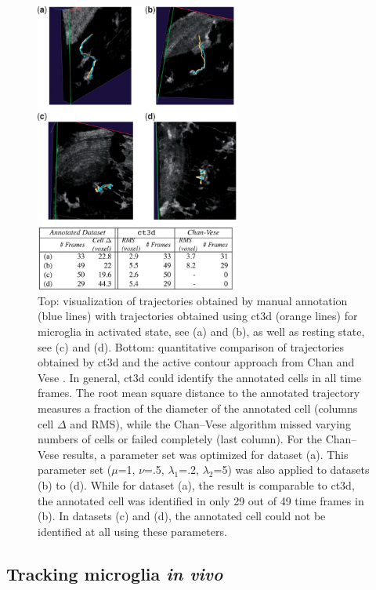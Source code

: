 \begin{figure}[htbp]
\centering
\includegraphics[width=0.6\textwidth]{images/coseg_fig6}
\caption[Cosegmentation results comparison with other methods]{Top: visualization of trajectories obtained by manual annotation (blue lines) with trajectories obtained using ct3d (orange lines) for microglia in activated state, see (a) and (b), as well as resting state, see (c) and (d). Bottom: quantitative comparison of trajectories obtained by ct3d and the active contour approach from Chan and Vese \cite{chan2001active}. In general, ct3d could identify the annotated cells in all time frames. The root mean square distance to the annotated trajectory measures a fraction of the diameter of the annotated cell (columns cell $\Delta$ and RMS), while the Chan–Vese algorithm missed varying numbers of cells or failed completely (last column). For the Chan–Vese results, a parameter set was optimized for dataset (a). This parameter set ($\mu$=1, $\nu$=.5, $\lambda_1$=.2, $\lambda_2$=5) was also applied to datasets (b) to (d). While for dataset (a), the result is comparable to ct3d, the annotated cell was identified in only 29 out of 49 time frames in (b). In datasets (c) and (d), the annotated cell could not be identified at all using these parameters.}
\label{fig:coseg-fig6}
\end{figure}
\subsection{Tracking microglia \textit{in vivo}}


